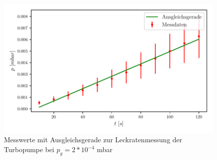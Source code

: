     \begin{figure}[H]
      \centering
      \includegraphics{build/plots/leck_turbo_0.0002.pdf}
      \caption{Messwerte mit Ausgleichsgerade zur Leckratenmessung der Turbopumpe bei $p_g = 2*10^{-4}$ mbar}
      \label{fig:plott2}
    \end{figure}

